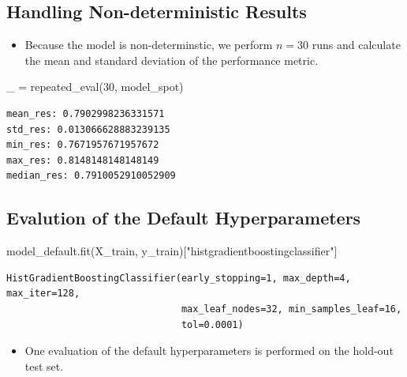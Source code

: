 \documentclass[
  letterpaper,
  DIV=11,
  numbers=noendperiod]{scrreprt}
\newenvironment{Shaded}{\begin{snugshade}}{\end{snugshade}}
\newcommand{\DecValTok}[1]{\textcolor[rgb]{0.68,0.00,0.00}{#1}}
\newcommand{\NormalTok}[1]{\textcolor[rgb]{0.00,0.23,0.31}{#1}}
\newcommand{\OperatorTok}[1]{\textcolor[rgb]{0.37,0.37,0.37}{#1}}
\newcommand{\StringTok}[1]{\textcolor[rgb]{0.13,0.47,0.30}{#1}}
\providecommand{\tightlist}{%
  \setlength{\itemsep}{0pt}\setlength{\parskip}{0pt}}\usepackage{longtable,booktabs,array}
\begin{document}
\hypertarget{handling-non-deterministic-results-1}{%
\subsection{Handling Non-deterministic
Results}\label{handling-non-deterministic-results-1}}

\begin{itemize}
\tightlist
\item
  Because the model is non-determinstic, we perform \(n=30\) runs and
  calculate the mean and standard deviation of the performance metric.
\end{itemize}

\begin{Shaded}
\begin{Highlighting}[]
\NormalTok{\_ }\OperatorTok{=}\NormalTok{ repeated\_eval(}\DecValTok{30}\NormalTok{, model\_spot)}
\end{Highlighting}
\end{Shaded}

\begin{verbatim}
mean_res: 0.7902998236331571
std_res: 0.013066628883239135
min_res: 0.7671957671957672
max_res: 0.8148148148148149
median_res: 0.7910052910052909
\end{verbatim}

\hypertarget{evalution-of-the-default-hyperparameters-1}{%
\subsection{Evalution of the Default
Hyperparameters}\label{evalution-of-the-default-hyperparameters-1}}

\begin{Shaded}
\begin{Highlighting}[]
\NormalTok{model\_default.fit(X\_train, y\_train)[}\StringTok{"histgradientboostingclassifier"}\NormalTok{]}
\end{Highlighting}
\end{Shaded}

\begin{verbatim}
HistGradientBoostingClassifier(early_stopping=1, max_depth=4, max_iter=128,
                               max_leaf_nodes=32, min_samples_leaf=16,
                               tol=0.0001)
\end{verbatim}

\begin{itemize}
\tightlist
\item
  One evaluation of the default hyperparameters is performed on the
  hold-out test set.
\end{itemize}
\end{document}

